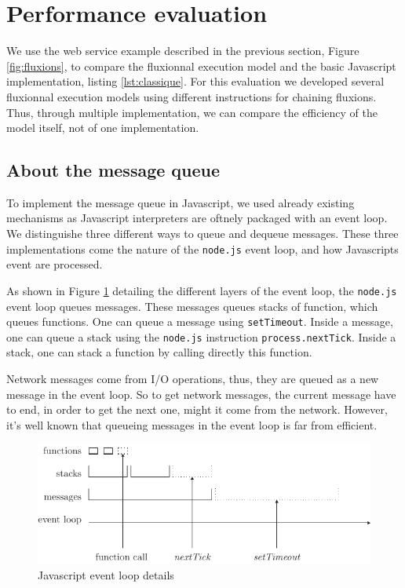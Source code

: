 \section{Performance evaluation}

We use the web service example described in the previous section, Figure \ref{fig:fluxions}, to compare the fluxionnal execution model and the basic Javascript implementation, listing \ref{lst:classique}.
For this evaluation we developed several fluxionnal execution models using different instructions for chaining fluxions.
Thus, through multiple implementation, we can compare the efficiency of the model itself, not of one implementation.

\subsection{About the message queue}

To implement the message queue in Javascript, we used already existing mechanisms as Javascript interpreters are oftnely packaged with an event loop.
We distinguishe three different ways to queue and dequeue messages. These three implementations come the nature of the \texttt{node.js} event loop, and how Javascripts event are processed.

As shown in Figure \ref{fig:eventloop} detailing the different layers of the event loop, the \texttt{node.js} event loop queues messages.
These messages queues stacks of function, which queues functions.
One can queue a message using \texttt{setTimeout}.
Inside a message, one can queue a stack using the \texttt{node.js} instruction \texttt{process.nextTick}.
Inside a stack, one can stack a function by calling directly this function.

Network messages come from I/O operations, thus, they are queued as a new message in the event loop.
So to get network messages, the current message have to end, in order to get the next one, might it come from the network.
However, it's well known that queueing messages in the event loop is far from efficient.

\begin{figure}[h!]
  \includegraphics[width=\linewidth]{eventloop.pdf}
  \caption{Javascript event loop details}
  \label{fig:eventloop}
\end{figure}

